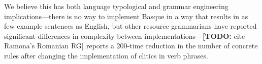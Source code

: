 \documentclass[11pt]{article}
\newcommand{\todo}[1]{{\color{cyan}\textbf{[TODO: }#1\textbf{]}}}
\begin{document}
We believe this has both language typological and grammar engineering
implications---there is no way to implement Basque in a way that
results in as few example sentences as English, but other resource
grammarians have reported significant differences in complexity
between implementations---\todo{cite Ramona's Romanian RG} reports a
200-time reduction in the number of concrete rules after changing the
implementation of clitics in verb phrases.






\end{document}
